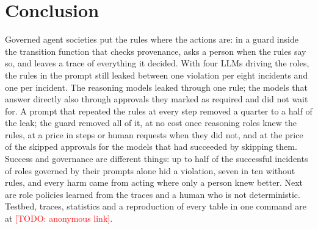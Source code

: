 \documentclass[10pt,conference]{IEEEtran}
\newcommand{\todo}[1]{\textcolor{red}{[TODO: #1]}}
\begin{document}
\section{Conclusion}
\label{sec:conclusion}
Governed agent societies put the rules where the actions are: in a guard inside the transition function that checks provenance, asks a person when the rules say so, and leaves a trace of everything it decided. With four LLMs driving the roles, the rules in the prompt still leaked between one violation per eight incidents and one per incident. The reasoning models leaked through one rule; the models that answer directly also through approvals they marked as required and did not wait for. A prompt that repeated the rules at every step removed a quarter to a half of the leak; the guard removed all of it, at no cost once reasoning roles knew the rules, at a price in steps or human requests when they did not, and at the price of the skipped approvals for the models that had succeeded by skipping them. Success and governance are different things: up to half of the successful incidents of roles governed by their prompts alone hid a violation, seven in ten without rules, and every harm came from acting where only a person knew better. Next are role policies learned from the traces and a human who is not deterministic. Testbed, traces, statistics and a reproduction of every table in one command are at \todo{anonymous link}.



\end{document}
